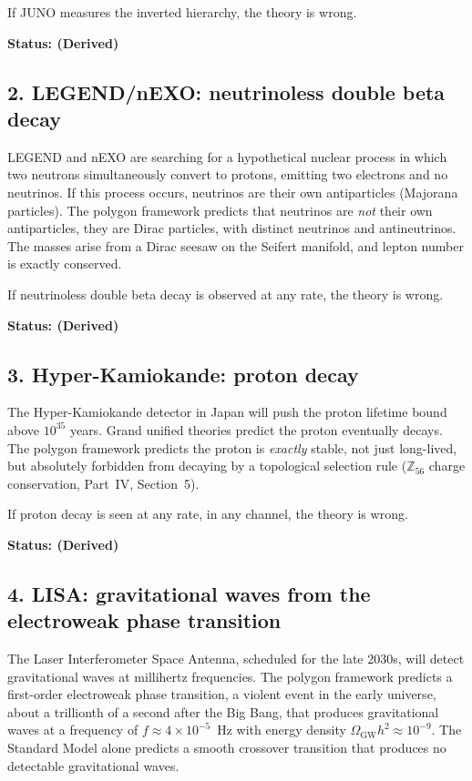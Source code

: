 If JUNO measures the inverted hierarchy, the theory is wrong.

\textbf{Status: (Derived)}

\subsection*{2. LEGEND/nEXO: neutrinoless double beta decay}

LEGEND and nEXO are searching for a hypothetical nuclear process in
which two neutrons simultaneously convert to protons, emitting two
electrons and no neutrinos. If this process occurs, neutrinos are their
own antiparticles (Majorana particles). The polygon framework predicts
that neutrinos are \emph{not} their own antiparticles, they are Dirac
particles, with distinct neutrinos and antineutrinos. The masses arise
from a Dirac seesaw on the Seifert manifold, and lepton number is
exactly conserved.

If neutrinoless double beta decay is observed at any rate, the theory is
wrong.

\textbf{Status: (Derived)}

\subsection*{3. Hyper-Kamiokande: proton decay}

The Hyper-Kamiokande detector in Japan will push the proton lifetime
bound above $10^{35}$ years. Grand unified theories predict the proton
eventually decays. The polygon framework predicts the proton is
\emph{exactly} stable, not just long-lived, but absolutely forbidden
from decaying by a topological selection rule ($\mathbb{Z}_{56}$ charge
conservation, Part~IV, Section~5).

If proton decay is seen at any rate, in any channel, the theory is
wrong.

\textbf{Status: (Derived)}

\subsection*{4. LISA: gravitational waves from the electroweak phase transition}

The Laser Interferometer Space Antenna, scheduled for the late 2030s,
will detect gravitational waves at millihertz frequencies. The polygon
framework predicts a first-order electroweak phase transition, a
violent event in the early universe, about a trillionth of a second
after the Big Bang, that produces gravitational waves at a frequency
of $f \approx 4 \times 10^{-5}$~Hz with energy density
$\Omega_{\mathrm{GW}} h^2 \approx 10^{-9}$. The Standard Model alone
predicts a smooth crossover transition that produces no detectable
gravitational waves.

